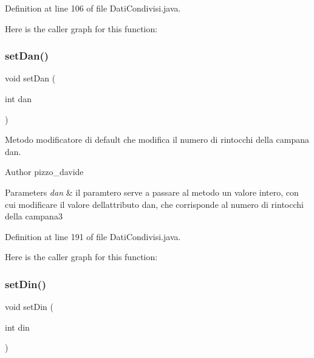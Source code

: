 Definition at line 106 of file Dati\+Condivisi.\+java.

Here is the caller graph for this function\+:
\mbox{\label{classcampane_1_1_dati_condivisi_a0af8623c62b599c95f970b3f3d97da3a}} 
\subsubsection{\texorpdfstring{set\+Dan()}{setDan()}}
{\footnotesize\ttfamily void set\+Dan (\begin{DoxyParamCaption}\item[{int}]{dan }\end{DoxyParamCaption})}



Metodo modificatore di default che modifica il numero di rintocchi della campana \textquotesingle{}dan\textquotesingle{}. 

\begin{DoxyAuthor}{Author}
pizzo\+\_\+davide
\end{DoxyAuthor}

\begin{DoxyParams}{Parameters}
{\em dan} & il paramtero serve a passare al metodo un valore intero, con cui modificare il valore dell\textquotesingle{}attributo dan, che corrisponde al numero di rintocchi della campana3 \\
\hline
\end{DoxyParams}


Definition at line 191 of file Dati\+Condivisi.\+java.

Here is the caller graph for this function\+:
\mbox{\label{classcampane_1_1_dati_condivisi_a0efe7c0aafacd9cfc6b099e007885ee8}} 
\subsubsection{\texorpdfstring{set\+Din()}{setDin()}}
{\footnotesize\ttfamily void set\+Din (\begin{DoxyParamCaption}\item[{int}]{din }\end{DoxyParamCaption})}



